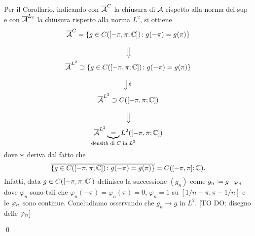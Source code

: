 \begin{enumerate}
		Per il Corollario, indicando con $\overline{\mathcal{A}}^C$ la chiusura di $\mathcal{A}$ rispetto alla norma del sup e con $\overline{\mathcal{A}}^{L_2}$ la chiusura rispetto alla norma $L^2$, si ottiene
		\begin{gather*}
			\ol{\mc{A}}^C = \left\{ g \in C([-\pi,\pi;\C]) \colon g(-\pi) = g(\pi) \right\} \\
			\text{\rotatebox{270}{$\Longrightarrow$}} \\
			\ol{\mc{A}}^{L^2} \supset \left\{ g \in C([-\pi,\pi;\C]) \colon g(-\pi) = g(\pi) \right\} \\
			\text{\rotatebox{270}{$\stackrel{\scalebox{1.2}{$\ast$}}{\Longrightarrow}$}} \\
			\ol{\mc{A}}^{L^2} \supset C([-\pi,\pi;\C]) \\
			\text{\rotatebox{270}{$\Longrightarrow$}} \\
			\ol{\mc{A}}^{L^2} \underbrace{=}_{\mathclap{\text{densità di $C$ in $L^2$}}} L^2([-\pi,\pi;\C])
		\end{gather*}
		dove $\scalebox{1.2}{$\ast$}$ deriva dal fatto che 
		$$
			\overline{\left\{ g \in C([-\pi,\pi;\mathbb C]) \colon g(-\pi) = g(\pi) \right\}}
			= C([-\pi,\pi];\mathbb C).
		$$
		Infatti, data $g \in C([-\pi,\pi;\mathbb C])$ definisco la successione $(g_n)$ come $g_n \coloneqq g \cdot \varphi_n$ dove $\varphi_n$ sono tali che $\varphi_n(-\pi) = \varphi_n(\pi) = 0$, $\varphi_n = 1$ su $[1/n - \pi, \pi - 1/n]$ e le $\varphi_n$ sono continue.
		Concludiamo osservando che $g_n \to g$ in $L^2$. [TO DO: disegno delle $\varphi_n$]

		
\qed
\end{enumerate}
